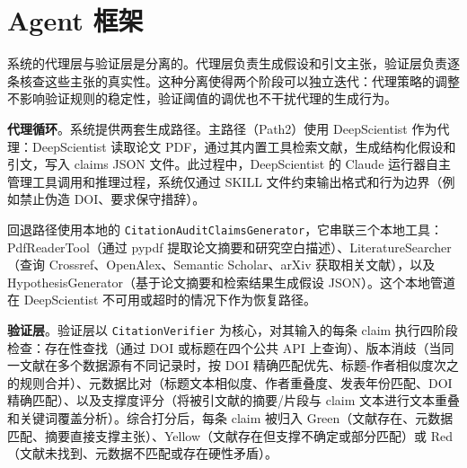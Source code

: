 \documentclass[11pt,a4paper]{ctexart}
\begin{document}
\begin{center}
\end{center}

\section{Agent 框架}

系统的代理层与验证层是分离的。代理层负责生成假设和引文主张，验证层负责逐条核查这些主张的真实性。这种分离使得两个阶段可以独立迭代：代理策略的调整不影响验证规则的稳定性，验证阈值的调优也不干扰代理的生成行为。

\textbf{代理循环}。系统提供两套生成路径。主路径（Path2）使用 DeepScientist 作为代理：DeepScientist 读取论文 PDF，通过其内置工具检索文献，生成结构化假设和引文，写入 claims JSON 文件。此过程中，DeepScientist 的 Claude 运行器自主管理工具调用和推理过程，系统仅通过 SKILL 文件约束输出格式和行为边界（例如禁止伪造 DOI、要求保守措辞）。

回退路径使用本地的 \texttt{CitationAuditClaimsGenerator}，它串联三个本地工具：PdfReaderTool（通过 pypdf 提取论文摘要和研究空白描述）、LiteratureSearcher（查询 Crossref、OpenAlex、Semantic Scholar、arXiv 获取相关文献），以及 HypothesisGenerator（基于论文摘要和检索结果生成假设 JSON）。这个本地管道在 DeepScientist 不可用或超时的情况下作为恢复路径。

\textbf{验证层}。验证层以 \texttt{CitationVerifier} 为核心，对其输入的每条 claim 执行四阶段检查：存在性查找（通过 DOI 或标题在四个公共 API 上查询）、版本消歧（当同一文献在多个数据源有不同记录时，按 DOI 精确匹配优先、标题-作者相似度次之的规则合并）、元数据比对（标题文本相似度、作者重叠度、发表年份匹配、DOI 精确匹配）、以及支撑度评分（将被引文献的摘要/片段与 claim 文本进行文本重叠和关键词覆盖分析）。综合打分后，每条 claim 被归入 Green（文献存在、元数据匹配、摘要直接支撑主张）、Yellow（文献存在但支撑不确定或部分匹配）或 Red（文献未找到、元数据不匹配或存在硬性矛盾）。
\end{document}
